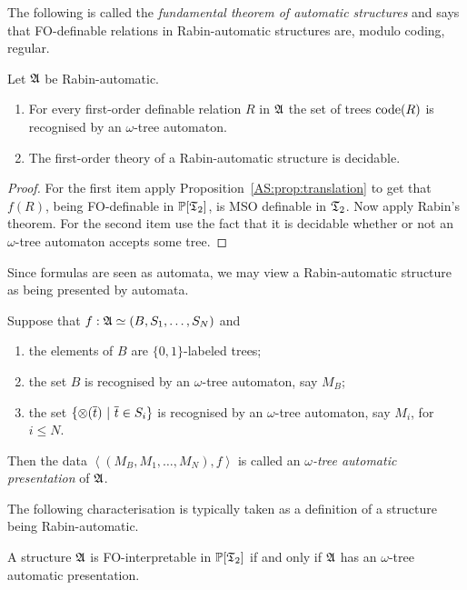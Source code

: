 The following is called the {\em fundamental theorem of automatic structures} and says that FO-definable relations in Rabin-automatic structures are, modulo coding, regular. 

\begin{theorem} \label{AS:thm:fundthm} 
Let $\mathfrak{A}$ be Rabin-automatic.
\begin{enumerate}
\item For every first-order definable relation $R$ in $\mathfrak{A}$ the set of trees ${\rm code}({R})$ is recognised by an $\omega$-tree automaton.
\item The first-order theory of a Rabin-automatic structure is decidable.
\end{enumerate}
\end{theorem}

\begin{proof}
For the first item apply Proposition~\ref{AS:prop:translation} to get that $f(R)$, being FO-definable in ${\mathbb P}[\mathfrak{T}_2]$, is 
MSO definable in $\mathfrak{T}_2$. Now apply Rabin's theorem.
For the second item use the fact that it is decidable whether or not an $\omega$-tree automaton accepts some tree.
\end{proof}

Since formulas are seen as automata, we may view a Rabin-automatic structure as being presented by automata.



\begin{definition} \label{AS:dfn:rap} 
Suppose that $f: \mathfrak{A} \simeq  (B,S_1,\dots,S_N)$ and
\begin{enumerate}
\item the elements of $B$ are $\{0,1\}$-labeled trees;
\item the set $B$ is recognised by an $\omega$-tree automaton, say $M_B$; 
\item the set $\{\otimes(\mbox{$\overline {t}$}) \ \vert \  \mbox{$\overline {t}$} \in S_i\}$ is recognised by an $\omega$-tree automaton, say $M_i$, for $i \leq N$.
\end{enumerate}
Then the data $\left<(M_B,M_1,\dots,M_N), f \right>$ is called an {\em $\omega$-tree automatic presentation} of $\mathfrak{A}$.
\end{definition}

The following characterisation is typically taken as a definition of a structure being Rabin-automatic. 

\begin{proposition}
A structure $\mathfrak{A}$ is FO-interpretable in ${\mathbb P}[\mathfrak{T}_2]$ if and only if $\mathfrak{A}$ has an $\omega$-tree automatic presentation.
\end{proposition}

